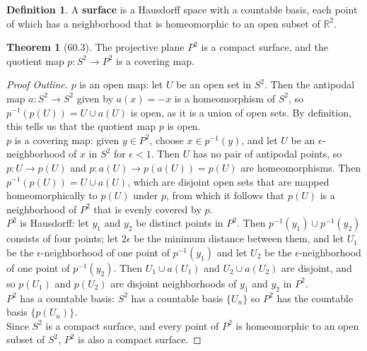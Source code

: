 \documentclass[11pt]{article}
\newcommand{\R}{\mathbb{R}}
\theoremstyle{definition}
\theoremstyle{theorem}
\newtheorem*{definition}{Definition}
\newtheorem*{theorem}{Theorem}
\begin{document}
\begin{definition}
A \textbf{surface} is a Hausdorff space with a countable basis, each point of which has a neighborhood that is homeomorphic to an open subset of $\R^2$.
\end{definition}

\begin{theorem}[60.3]
The projective plane $P^2$ is a compact surface, and the quotient map $p\colon S^2 \rightarrow P^2$ is a covering map.
\end{theorem}

\begin{proof}[Proof Outline]
$p$ is an open map: let $U$ be an open set in $S^2$. Then the antipodal map $a \colon S^2 \rightarrow S^2$ given by $a(x) = -x$ is a homeomorphism of $S^2$, so $p^{-1}(p(U)) = U \cup a(U)$ is open, as it is a union of open sets. By definition, this tells us that the quotient map $p$ is open. \\

$p$ is a covering map: given $y \in P^2$, choose $x \in p^{-1}(y)$, and let $U$ be an $\epsilon$-neighborhood of $x$ in $S^2$ for $\epsilon < 1$. Then $U$ has no pair of antipodal points, so $p \colon U \rightarrow p(U)$ and $p \colon a(U) \rightarrow p(a(U)) = p(U)$ are homeomorphisms. Then $p^{-1}(p(U)) = U \cup a(U)$, which are disjoint open sets that are mapped homeomorphically to $p(U)$ under $p$, from which it follows that $p(U)$ is a neighborhood of $P^2$ that is evenly covered by $p$. \\

$P^2$ is Hausdorff: let $y_1$ and $y_2$ be distinct points in $P^2$. Then $p^{-1}(y_1) \cup p^{-1}(y_2)$ consists of four points; let $2\epsilon$ be the minimum distance between them, and let $U_1$ be the $\epsilon$-neighborhood of one point of $p^{-1}(y_1)$ and let $U_2$ be the $\epsilon$-neighborhood of one point of $p^{-1}(y_2)$. Then $U_1 \cup a(U_1)$ and $U_2 \cup a(U_2)$ are disjoint, and so $p(U_1)$ and $p(U_2)$ are disjoint neighborhoods of $y_1$ and $y_2$ in $P^2$. \\

$P^2$ has a countable basis: $S^2$ has a countable basis $\{U_n\}$ so $P^2$ has the countable basis $\{p(U_n)\}$. \\

Since $S^2$ is a compact surface, and every point of $P^2$ is homeomorphic to an open subset of $S^2$, $P^2$ is also a compact surface.
\end{proof}
\end{document}
